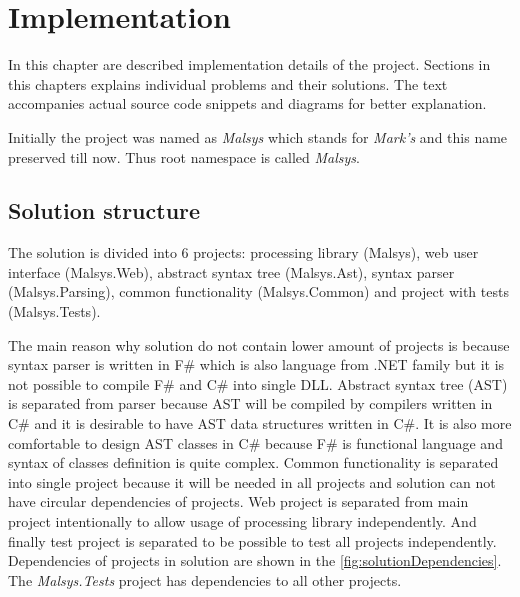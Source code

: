 
\chapter{Implementation}
\label{chap:implementation}

In this chapter are described implementation details of the project.
Sections in this chapters explains individual problems and their solutions.
The text accompanies actual source code snippets and diagrams for better explanation.


Initially the project was named as \emph{Malsys} which stands for \emph{Mark's \lsystems} and this name preserved till now.
Thus root namespace is called \emph{Malsys}.


\section{Solution structure}

The solution is divided into 6 projects: \lsystem processing library (Malsys), web user interface (Malsys.Web), abstract syntax tree (Malsys.Ast), syntax parser (Malsys.Parsing), common functionality (Malsys.Common) and project with tests (Malsys.Tests).

The main reason why solution do not contain lower amount of projects is because syntax parser is written in F\# which is also language from .NET family but it is not possible to compile F\# and C\# into single DLL.
Abstract syntax tree (AST) is separated from parser because AST will be compiled by compilers written in C\# and it is desirable to have AST data structures written in C\#.
It is also more comfortable to design AST classes in C\# because F\# is functional language and syntax of classes definition is quite complex.
Common functionality is separated into single project because it will be needed in all projects and solution can not have circular dependencies of projects.
Web project is separated from main project intentionally to allow usage of \lsystem processing library independently.
And finally test project is separated to be possible to test all projects independently.
Dependencies of projects in solution are shown in the \autoref{fig:solutionDependencies}.
The \emph{Malsys.Tests} project has dependencies to all other projects.

